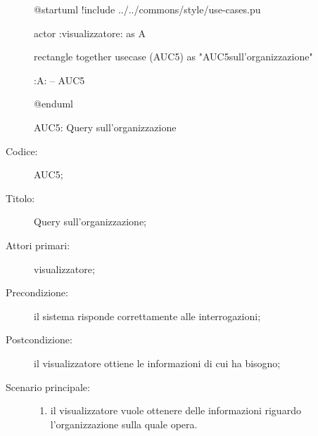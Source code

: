 \documentclass[../../../analisi-dei-requisiti.tex]{subfiles}
\begin{document}
\begin{figure}[H]
  \centering
  \begin{plantuml}
  @startuml
  !include ../../commons/style/use-cases.pu

  actor :visualizzatore: as A

  rectangle {
    together {
      usecase (AUC5) as "AUC5\nQuery sull'organizzazione"
    }
  }

  :A: -- AUC5

  @enduml
  \end{plantuml}
  \caption{AUC5: Query sull'organizzazione}%
  \label{fig:AUC5}
\end{figure}

\begin{description}
  \item[Codice:] AUC5;
  \item[Titolo:] Query sull'organizzazione;
  \item[Attori primari:] visualizzatore;
  \item[Precondizione:] il sistema risponde correttamente alle interrogazioni;
  \item[Postcondizione:] il visualizzatore ottiene le informazioni di cui ha bisogno;
  \item[Scenario principale:]
  \begin{enumerate}
    \item il visualizzatore vuole ottenere delle informazioni riguardo l'organizzazione sulla quale opera.
  \end{enumerate}
\end{description}
\end{document}
